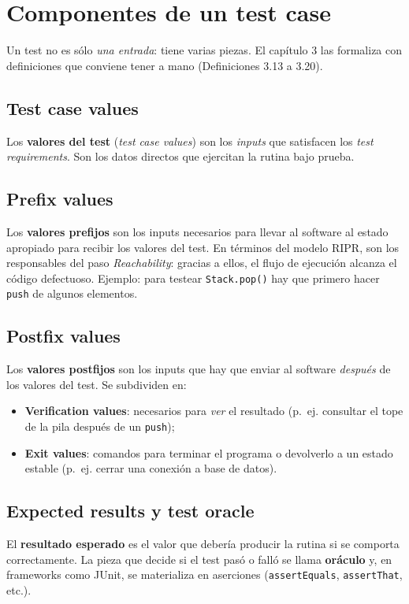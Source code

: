 \documentclass[12pt,a4paper]{article}
\begin{document}
\section{Componentes de un test case}

Un test no es sólo \textit{una entrada}: tiene varias piezas. El capítulo 3 las formaliza con definiciones que conviene tener a mano (Definiciones 3.13 a 3.20).

\subsection{Test case values}
Los \textbf{valores del test} (\textit{test case values}) son los \textit{inputs} que satisfacen los \textit{test requirements}. Son los datos directos que ejercitan la rutina bajo prueba.

\subsection{Prefix values}
Los \textbf{valores prefijos} son los inputs necesarios para llevar al software al estado apropiado para recibir los valores del test. En términos del modelo RIPR, son los responsables del paso \textit{Reachability}: gracias a ellos, el flujo de ejecución alcanza el código defectuoso. Ejemplo: para testear \texttt{Stack.pop()} hay que primero hacer \texttt{push} de algunos elementos.

\subsection{Postfix values}
Los \textbf{valores postfijos} son los inputs que hay que enviar al software \textit{después} de los valores del test. Se subdividen en:
\begin{itemize}
  \item \textbf{Verification values}: necesarios para \textit{ver} el resultado (p.~ej. consultar el tope de la pila después de un \texttt{push});
  \item \textbf{Exit values}: comandos para terminar el programa o devolverlo a un estado estable (p.~ej. cerrar una conexión a base de datos).
\end{itemize}

\subsection{Expected results y test oracle}
El \textbf{resultado esperado} es el valor que debería producir la rutina si se comporta correctamente. La pieza que decide si el test pasó o falló se llama \textbf{oráculo} y, en frameworks como JUnit, se materializa en aserciones (\texttt{assertEquals}, \texttt{assertThat}, etc.).
\end{document}
